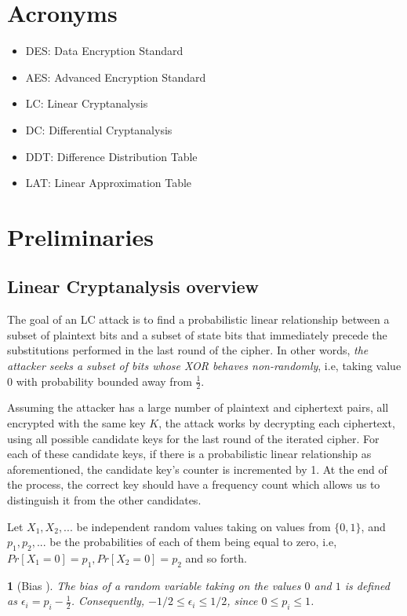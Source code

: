 \documentclass{report}
\newtheorem*{concept}{}{\bfseries}{\itshape}
\begin{document}
\section{Acronyms}
\begin{itemize}
    \item DES: Data Encryption Standard
    \item AES: Advanced Encryption Standard
    \item LC: Linear Cryptanalysis
    \item DC: Differential Cryptanalysis
    \item DDT: Difference Distribution Table
    \item LAT: Linear Approximation Table
\end{itemize}

\section{Preliminaries}

\subsection{Linear Cryptanalysis overview}

The goal of an LC attack is to find a probabilistic linear relationship between a subset of plaintext bits and a subset of state bits that immediately precede the substitutions performed in the last round of the cipher. In other words, \emph{the attacker seeks a subset of bits whose XOR behaves non-randomly}, i.e, taking value 0 with probability bounded away from $\frac{1}{2}$.

Assuming the attacker has a large number of plaintext and ciphertext pairs, all encrypted with the same key $K$, the attack works by decrypting each ciphertext, using all possible candidate keys for the last round of the iterated cipher. For each of these candidate keys, if there is a probabilistic linear relationship as aforementioned, the candidate key's counter is incremented by 1. At the end of the process, the correct key should have a frequency count which allows us to distinguish it from the other candidates.

Let $X_1, X_2, ...$ be independent random values taking on values from $\{0,1\}$, and $p_1, p_2, ...$ be the probabilities of each of them being equal to zero, i.e, $Pr[X_1 = 0] = p_1, Pr[X_2 = 0] = p_2$ and so forth. 
\begin{concept}[Bias \cite{Matsui1993LinearCM}]
The \emph{bias} of a random variable taking on the values $0$ and $1$ is defined as $\epsilon_i = p_i - \frac{1}{2}$. Consequently, $-1/2 \leq \epsilon_i \leq 1/2$, since $0 \leq p_i \leq 1$.
\end{concept}
\end{document}

